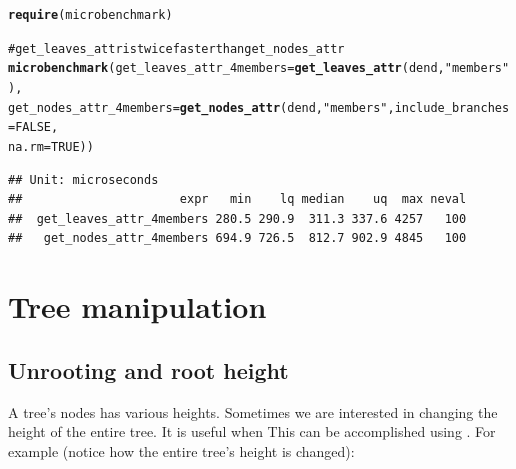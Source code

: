 \documentclass[shortnames,nojss,article]{jss}\usepackage{graphicx, color}
\makeatletter
\newcommand{\hlfunctioncall}[1]{\textcolor[rgb]{0.501960784313725,0,0.329411764705882}{\textbf{#1}}}%
\newcommand{\hlstring}[1]{\textcolor[rgb]{0.6,0.6,1}{#1}}%
\newcommand{\hlcomment}[1]{\textcolor[rgb]{0.180392156862745,0.6,0.341176470588235}{#1}}%
\newenvironment{kframe}{%
 \def\at@end@of@kframe{}%
 \ifinner\ifhmode%
  \def\at@end@of@kframe{\end{minipage}}%
  \begin{minipage}{\columnwidth}%
 \fi\fi%
 \def\FrameCommand##1{\hskip\@totalleftmargin \hskip-\fboxsep
 \colorbox{shadecolor}{##1}\hskip-\fboxsep
     \hskip-\linewidth \hskip-\@totalleftmargin \hskip\columnwidth}%
 \MakeFramed {\advance\hsize-\width
   \@totalleftmargin\z@ \linewidth\hsize
   \@setminipage}}%
 {\par\unskip\endMakeFramed%
 \at@end@of@kframe}
\newenvironment{knitrout}{}{} %
\makeatother
\begin{document}
\begin{knitrout}
\color{fgcolor}\begin{kframe}
\begin{alltt}

\hlfunctioncall{require}(microbenchmark)
\end{alltt}


{\ttfamily\noindent\itshape\color{messagecolor}{\#\# Loading required package: microbenchmark}}\begin{alltt}
\hlcomment{# get_leaves_attr is twice faster than get_nodes_attr}
\hlfunctioncall{microbenchmark}(get_leaves_attr_4members = \hlfunctioncall{get_leaves_attr}(dend, \hlstring{"members"}), 
    get_nodes_attr_4members = \hlfunctioncall{get_nodes_attr}(dend, \hlstring{"members"}, include_branches = FALSE, 
        na.rm = TRUE))
\end{alltt}
\begin{verbatim}
## Unit: microseconds
##                      expr   min    lq median    uq  max neval
##  get_leaves_attr_4members 280.5 290.9  311.3 337.6 4257   100
##   get_nodes_attr_4members 694.9 726.5  812.7 902.9 4845   100
\end{verbatim}
\begin{alltt}


\end{alltt}
\end{kframe}
\end{knitrout}







\section{Tree manipulation}

\subsection{Unrooting and root height}

A tree's nodes has various heights. Sometimes we are interested in changing the height of the entire tree. It is useful when This can be accomplished using . For example (notice how the entire tree's height is changed):
\end{document}
